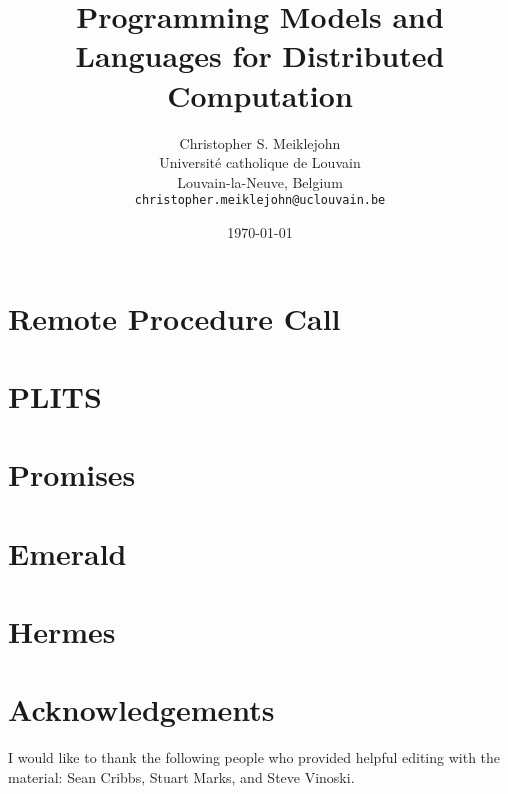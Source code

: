 \documentclass[11pt,twoside,a4paper]{article}
\theoremstyle{definition}
\theoremstyle{definition}
\theoremstyle{remark}
\begin{document}
\title{Programming Models and Languages for Distributed Computation}

\author{Christopher S. Meiklejohn\\
  Universit\'e catholique de Louvain\\
  Louvain-la-Neuve, Belgium\\
  \texttt{christopher.meiklejohn@uclouvain.be}}
  
\date{\today}
\maketitle
\clearpage

\tableofcontents

\clearpage


\section{Remote Procedure Call}

\clearpage

\section{PLITS}

\clearpage

\section{Promises}

\clearpage

\section{Emerald}

\clearpage

\section{Hermes}

\clearpage

\section*{Acknowledgements}
I would like to thank the following people who provided helpful editing with the material: Sean Cribbs, Stuart Marks, and Steve Vinoski.

\clearpage



\end{document}
